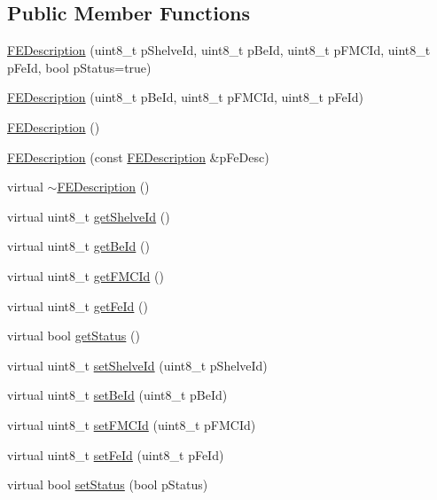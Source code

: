 \subsection*{Public Member Functions}
\begin{DoxyCompactItemize}
\item 
\hyperlink{class_ph2___hw_description_1_1_f_e_description_a23be149c77c625424510e88adf3e95d4}{F\-E\-Description} (uint8\-\_\-t p\-Shelve\-Id, uint8\-\_\-t p\-Be\-Id, uint8\-\_\-t p\-F\-M\-C\-Id, uint8\-\_\-t p\-Fe\-Id, bool p\-Status=true)
\item 
\hyperlink{class_ph2___hw_description_1_1_f_e_description_acbcf750f0bf74a954eb50db7255e5c26}{F\-E\-Description} (uint8\-\_\-t p\-Be\-Id, uint8\-\_\-t p\-F\-M\-C\-Id, uint8\-\_\-t p\-Fe\-Id)
\item 
\hyperlink{class_ph2___hw_description_1_1_f_e_description_abc5f53987051c0d9746c97e1d993b143}{F\-E\-Description} ()
\item 
\hyperlink{class_ph2___hw_description_1_1_f_e_description_a1169ae7f8f71a37ff35b7c31f6452611}{F\-E\-Description} (const \hyperlink{class_ph2___hw_description_1_1_f_e_description}{F\-E\-Description} \&p\-Fe\-Desc)
\item 
virtual \hyperlink{class_ph2___hw_description_1_1_f_e_description_a6f055cd3fade537864dd7c3b34fede39}{$\sim$\-F\-E\-Description} ()
\item 
virtual uint8\-\_\-t \hyperlink{class_ph2___hw_description_1_1_f_e_description_a4e532c3b78e6a4a1b5f0022005898e25}{get\-Shelve\-Id} ()
\item 
virtual uint8\-\_\-t \hyperlink{class_ph2___hw_description_1_1_f_e_description_a9077e5848363bf04b1c5860726879e79}{get\-Be\-Id} ()
\item 
virtual uint8\-\_\-t \hyperlink{class_ph2___hw_description_1_1_f_e_description_a3bf79b7197bf731c85e9041f94ad4351}{get\-F\-M\-C\-Id} ()
\item 
virtual uint8\-\_\-t \hyperlink{class_ph2___hw_description_1_1_f_e_description_ab282dc785d2db2e8837b082d85fb9bb3}{get\-Fe\-Id} ()
\item 
virtual bool \hyperlink{class_ph2___hw_description_1_1_f_e_description_a617ae77418832f97179026559685ea2d}{get\-Status} ()
\item 
virtual uint8\-\_\-t \hyperlink{class_ph2___hw_description_1_1_f_e_description_ab207edf946f371bef6860fb6ce4deb65}{set\-Shelve\-Id} (uint8\-\_\-t p\-Shelve\-Id)
\item 
virtual uint8\-\_\-t \hyperlink{class_ph2___hw_description_1_1_f_e_description_a13f1c20eb678b8e23d2590a8ff23d349}{set\-Be\-Id} (uint8\-\_\-t p\-Be\-Id)
\item 
virtual uint8\-\_\-t \hyperlink{class_ph2___hw_description_1_1_f_e_description_af0c396a0475a508e8aca069bb5b3c577}{set\-F\-M\-C\-Id} (uint8\-\_\-t p\-F\-M\-C\-Id)
\item 
virtual uint8\-\_\-t \hyperlink{class_ph2___hw_description_1_1_f_e_description_a681786aea17ed86c40a3274783d5f6b5}{set\-Fe\-Id} (uint8\-\_\-t p\-Fe\-Id)
\item 
virtual bool \hyperlink{class_ph2___hw_description_1_1_f_e_description_aa6e842d9be9aba79eccf5691ca6f7695}{set\-Status} (bool p\-Status)
\end{DoxyCompactItemize}
